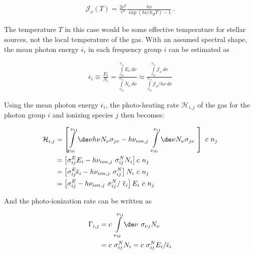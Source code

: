 \begin{align}
    \mathcal{J}_\nu(T) = \frac{2 \nu^2}{c^2} \frac{h \nu}{\exp\left(h\nu/k_B T\right) - 1} \ .
    \label{eq:blackbody}
\end{align}

The temperature $T$ in this case would be some effective temperature for stellar sources, not the
local temperature of the gas. With an assumed spectral shape, the mean photon energy
$\overline{\epsilon}_i$ in each frequency group $i$ can be estimated as


\begin{align}
\overline{\epsilon}_i \equiv
    \frac{E_i}{N_i} =
    \frac{
        \int\limits_{\nu_{i0}}^{\nu_{i1}} E_\nu \ d\nu
        }{
        \int\limits_{\nu_{i0}}^{\nu_{i1}} N_\nu \ d\nu
        }
    \approx
    \frac{
        \int\limits_{\nu_{i0}}^{\nu_{i1}} \mathcal{J}_\nu \ d\nu
        }{
        \int\limits_{\nu_{i0}}^{\nu_{i1}} \mathcal{J}_\nu / h\nu \ d\nu
        }
\end{align}

Using the mean photon energy $\overline{\epsilon}_i$, the photo-heating rate $\mathcal{H}_{i,j}$
of the gas for the photon group $i$ and ionizing species $j$ then becomes:

\begin{align}
\mathcal{H}_{i, j} &=
\left[
		\int\limits_{\nu_{i0}}^{\nu_{i1}}\de \nu h \nu N_\nu  \sigma_{j\nu} -
	h \nu_{ion,j}\
		\int\limits_{\nu_{i0}}^{\nu_{i1}}\de \nu N_\nu \sigma_{j\nu} \
\right] \ c \ n_j \\
%
&=
\left[
	\sigma_{ij}^E E_i - h \nu_{ion,j}\ \sigma_{ij}^N N_i
\right]  c \ n_j \\
&=
\left[
	\sigma_{ij}^E \overline{\epsilon}_i - h \nu_{ion,j}\ \sigma_{ij}^N
\right]  N_i\ c \ n_j \\
&=
\left[
	\sigma_{ij}^E  - h \nu_{ion,j}\ \sigma_{ij}^N /\ \overline{\epsilon}_i
\right]  E_i\ c \ n_j
\label{eq:photoheating-group}
\end{align}




And the photo-ionization rate can be written as

\begin{align}
\Gamma_{i, j}
	&=
		c \ \int\limits_{\nu_{i0}}^{\nu_{i1}}\de \nu \ \sigma_{\nu j} N_\nu \\
	&= c \ \sigma_{ij}^N N_i
	= c \ \sigma_{ij}^N E_i / \overline{\epsilon}_i \label{eq:photoionization-group}
\end{align}


